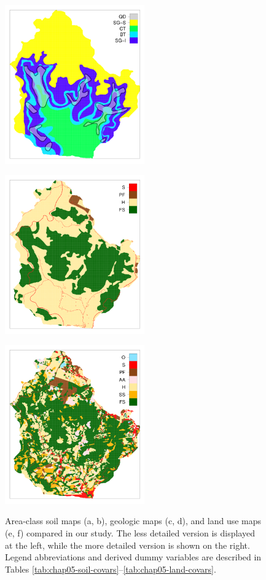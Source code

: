 \begin{figure}[!ht]
\begin{minipage}[b]{63mm}
 \end{minipage}
 \begin{minipage}[b]{63mm}
  \label{fig:chap05-geo-new}
  \centering
  \includegraphics[width=60mm]{fig/chap01FIG3e}
 \end{minipage}
 \begin{minipage}[b]{63mm}
  \label{fig:chap05-land-old}
  \centering
  \includegraphics[width=60mm]{fig/chap01FIG3c}
 \end{minipage}
 \begin{minipage}[b]{63mm}
  \label{fig:chap05-land-new}
  \centering
  \includegraphics[width=60mm]{fig/chap01FIG3f}
 \end{minipage}
 \caption{Area-class soil maps (a, b), geologic maps (c, d), and land use maps (e, f) compared in our study. 
 The less detailed version is displayed at the left, while the more detailed version is shown on the right. 
 Legend abbreviations and derived dummy variables are described in Tables
 \ref{tab:chap05-soil-covars}--\ref{tab:chap05-land-covars}.}
 \label{fig:chap05-cat-covars}
\end{figure}

